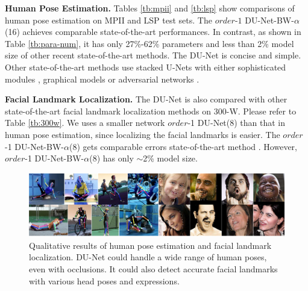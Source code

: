 {\bf Human Pose Estimation.}
Tables \ref{tb:mpii} and \ref{tb:lsp} show comparisons of human pose estimation on MPII and LSP test sets. The $order$-$1$  DU-Net-BW-$\alpha$(16) achieves comparable state-of-the-art performances. In contrast, as shown in Table \ref{tb:para-num}, it has only 27\%-62\% parameters and less than 2\% model size of other recent state-of-the-art methods. The DU-Net is concise and simple. Other state-of-the-art methods use stacked U-Nets with either sophisticated modules \cite{yang2017learning}, graphical models \cite{chu2017multi} or adversarial networks \cite{yu2017adversarial}.

{\bf Facial Landmark Localization.}
The DU-Net is also compared with other state-of-the-art facial landmark localization methods on 300-W. Please refer to Table \ref{tb:300w}. We uses a smaller network $order$-1 DU-Net(8) than that in human pose estimation, since localizing the facial landmarks is easier. The $order$-1 DU-Net-BW-$\alpha$(8) gets comparable errors state-of-the-art method \cite{newell2016stacked}. However, $order$-1 DU-Net-BW-$\alpha$(8) has only $\sim$2\% model size.

\begin{figure}[t!]
\centering
  \includegraphics[width=0.9\linewidth]{figures/pose-face-qualitive-results-cropped.pdf}
\caption{Qualitative results of human pose estimation and facial landmark localization. DU-Net could handle a wide range of human poses, even with occlusions. It could also detect accurate facial landmarks with various head poses and expressions.}
\label{fig:pose-face-qualitive}
\end{figure}

